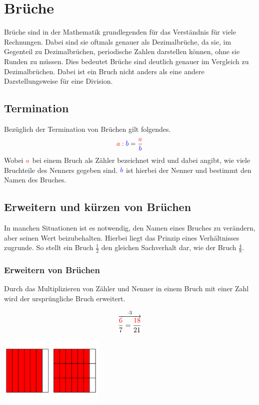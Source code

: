 \section{Brüche}\label{sec:Brueche}
Brüche sind in der Mathematik grundlegenden für das Verständnis für viele Rechnungen. Dabei sind sie oftmals genauer als Dezimalbrüche, da sie, im Gegenteil zu Dezimalbrüchen, periodische Zahlen darstellen können, ohne sie Runden zu müssen. Dies bedeutet Brüche sind deutlich genauer im Vergleich zu Dezimalbrüchen. Dabei ist ein Bruch nicht anders als eine andere Darstellungsweise für eine Division.
\subsection{Termination}\label{sec:Brueche/Termination}
 Bezüglich der Termination von Brüchen gilt folgendes.\\
\[\color{red}a:\color{blue}b\color{black}= \frac{\color{red}a}{\color{blue}b}\]
Wobei $\color{red}{a}$ bei einem Bruch als Zähler bezeichnet wird und dabei angibt, wie viele Bruchteile des Nenners gegeben sind.  $\color{blue}{b}$ ist hierbei der Nenner und bestimmt den Namen des Bruches.
\subsection{Erweitern und kürzen von Brüchen}\label{sec:Brueche/Erweitern und kuerzen von Bruechen}
In manchen Situationen ist es notwendig, den Namen eines Bruches zu verändern, aber seinen Wert beizubehalten. Hierbei liegt das Prinzip eines Verhältnisses zugrunde. So stellt ein Bruch $\frac{1}{2}$ den gleichen Sachverhalt dar, wie der Bruch $\frac{4}{8}$.
\subsubsection{Erweitern von Brüchen} Durch das Multiplizieren von Zähler und Nenner in einem Bruch mit einer Zahl wird der ursprüngliche Bruch erweitert. 
\begin{paracol}{2}
	\begin{flushleft}
	\begin{beispiel}
\[\overset{\cdot3}{\overrightarrow{\frac{\color{red}6}{7}=\frac{\color{red}18}{21}}}\]
	\end{beispiel}
	\end{flushleft}	
\switchcolumn
	\begin{flushright}
		\includegraphics[width=5cm]{Media/Theorieheft-Brueche-Erweitern.png}
	\end{flushright}
\end{paracol}
